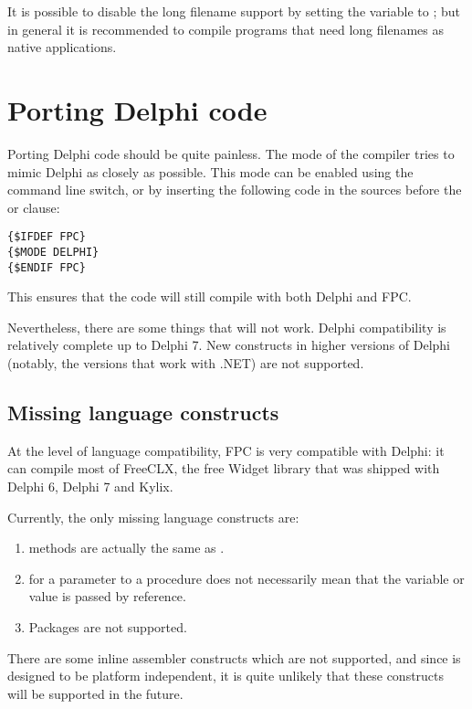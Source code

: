 It is possible to disable the long filename support by setting the
 variable to ; but in general it is recommended
to compile programs that need long filenames as native \windows applications.

\section{Porting Delphi code}

Porting Delphi code should be quite painless. The  mode of the
compiler tries to mimic Delphi as closely as possible.
This mode can be enabled using the  command line switch,
or by inserting the following code in the sources before the 
or  clause:
\begin{verbatim}
{$IFDEF FPC}
{$MODE DELPHI}
{$ENDIF FPC}
\end{verbatim}
This ensures that the code will still compile with both Delphi and FPC.

Nevertheless, there are some things that will not work.
Delphi compatibility is relatively complete up to Delphi 7.
New constructs in higher versions of Delphi
(notably, the versions that work with .NET) are not supported.

\subsection{Missing language constructs}
At the level of language compatibility, FPC is very compatible with Delphi:
it can compile most of FreeCLX, the free Widget library that was shipped
with Delphi 6, Delphi 7 and Kylix.

Currently, the only missing language constructs are:
\begin{enumerate}
\item {} methods are actually the same as .
\item {} for a parameter to a procedure does not necessarily
mean that the variable or value is passed by reference.
\item Packages are not supported.
\end{enumerate}

There are some inline assembler constructs which are not supported,
and since \fpc is designed to be platform independent, it is quite
unlikely that these constructs will be supported in the future.

